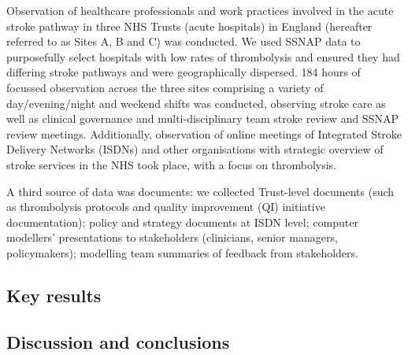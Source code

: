 Observation of healthcare professionals and work practices involved in the acute stroke pathway in three NHS Trusts (acute hospitals) in England (hereafter referred to as Sites A, B and C) was conducted. We used SSNAP data to purposefully select hospitals with low rates of thrombolysis and ensured they had differing stroke pathways and were geographically dispersed. 184 hours of focussed observation across the three sites comprising a variety of day/evening/night and weekend shifts was conducted, observing stroke care as well as clinical governance and multi-disciplinary team stroke review and SSNAP review meetings. Additionally, observation of online meetings of Integrated Stroke Delivery Networks (ISDNs) and other organisations with strategic overview of stroke services in the NHS took place, with a focus on thrombolysis. 

A third source of data was documents: we collected Trust-level documents (such as thrombolysis protocols and quality improvement (QI) initiative documentation); policy and strategy documents at ISDN level; computer modellers’ presentations to stakeholders (clinicians, senior managers, policymakers); modelling team summaries of feedback from stakeholders.

\subsection{Key results}

\subsection{Discussion and conclusions}